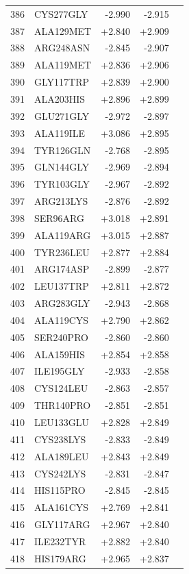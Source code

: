 \begin{longtable}{r l r r c}
386 & CYS277GLY & -2.990 & -2.915 &  \\
387 & ALA129MET & +2.840 & +2.909 &  \\
388 & ARG248ASN & -2.845 & -2.907 &  \\
389 & ALA119MET & +2.836 & +2.906 &  \\
390 & GLY117TRP & +2.839 & +2.900 &  \\
391 & ALA203HIS & +2.896 & +2.899 &  \\
392 & GLU271GLY & -2.972 & -2.897 &  \\
393 & ALA119ILE & +3.086 & +2.895 &  \\
394 & TYR126GLN & -2.768 & -2.895 &  \\
395 & GLN144GLY & -2.969 & -2.894 &  \\
396 & TYR103GLY & -2.967 & -2.892 &  \\
397 & ARG213LYS & -2.876 & -2.892 &  \\
398 & SER96ARG & +3.018 & +2.891 &  \\
399 & ALA119ARG & +3.015 & +2.887 &  \\
400 & TYR236LEU & +2.877 & +2.884 &  \\
401 & ARG174ASP & -2.899 & -2.877 &  \\
402 & LEU137TRP & +2.811 & +2.872 &  \\
403 & ARG283GLY & -2.943 & -2.868 &  \\
404 & ALA119CYS & +2.790 & +2.862 &  \\
405 & SER240PRO & -2.860 & -2.860 &  \\
406 & ALA159HIS & +2.854 & +2.858 &  \\
407 & ILE195GLY & -2.933 & -2.858 &  \\
408 & CYS124LEU & -2.863 & -2.857 &  \\
409 & THR140PRO & -2.851 & -2.851 &  \\
410 & LEU133GLU & +2.828 & +2.849 &  \\
411 & CYS238LYS & -2.833 & -2.849 &  \\
412 & ALA189LEU & +2.843 & +2.849 &  \\
413 & CYS242LYS & -2.831 & -2.847 &  \\
414 & HIS115PRO & -2.845 & -2.845 &  \\
415 & ALA161CYS & +2.769 & +2.841 &  \\
416 & GLY117ARG & +2.967 & +2.840 &  \\
417 & ILE232TYR & +2.882 & +2.840 &  \\
418 & HIS179ARG & +2.965 & +2.837 &  \\

\end{longtable}
